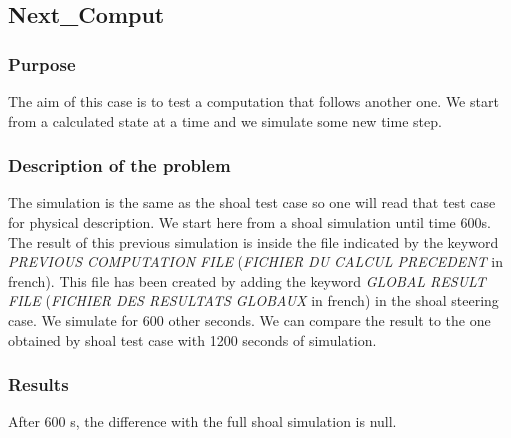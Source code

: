 \subsection{Next\_Comput}

\subsubsection{Purpose}
%
The aim of this case is to test a computation that follows another one. We start from a calculated state at a time and we simulate some new time step.
%
\subsubsection{Description of the problem}
%
The simulation is the same as the shoal test case so one will read that test case for physical description. We start here from a shoal simulation until time 600s. The result of this previous simulation is inside the file indicated by the keyword {\it PREVIOUS COMPUTATION FILE} ({\it FICHIER DU CALCUL PRECEDENT} in french). This file has been created by adding the keyword  {\it GLOBAL RESULT FILE} ({\it FICHIER DES RESULTATS GLOBAUX} in french) in the shoal steering case.
We simulate for 600 other seconds. We can compare the result to the one obtained by shoal test case with 1200 seconds of simulation.

\subsubsection{Results}
After 600 s, the difference with the full shoal simulation is null.